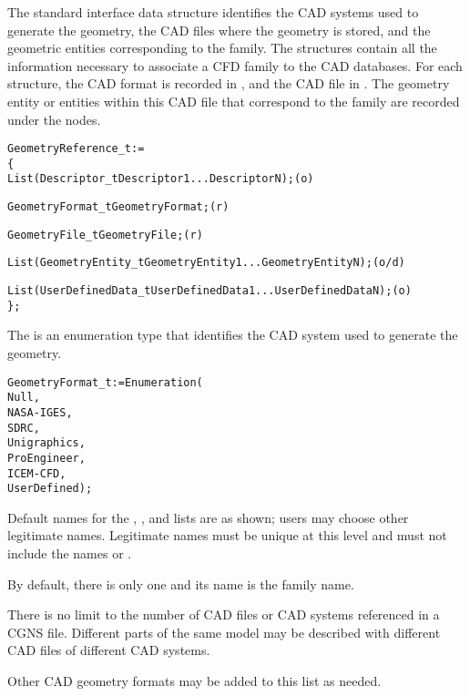 The standard interface data structure identifies the CAD systems used
to generate the geometry, the CAD files where the geometry is stored,
and the geometric entities corresponding to the family.
The  structures contain all the information
necessary to associate a CFD family to the CAD databases.
For each  structure, the CAD format
is recorded in , and the CAD file in
.
The geometry entity or entities within this CAD file that correspond to
the family are recorded under the  nodes.

\begin{alltt}
  GeometryReference\_t :=
    \{
    List( Descriptor\_t Descriptor1 ... DescriptorN ) ;                      (o)

    GeometryFormat\_t GeometryFormat ;                                       (r)

    GeometryFile\_t GeometryFile ;                                           (r)

    List (GeometryEntity\_t GeometryEntity1 ... GeometryEntityN) ;           (o/d)

    List( UserDefinedData\_t UserDefinedData1 ... UserDefinedDataN ) ;       (o)
    \} ;
\end{alltt}

The  is an enumeration type that identifies the CAD
system used to generate the geometry.

\begin{alltt}
  GeometryFormat_t := Enumeration(
    Null,
    NASA-IGES,
    SDRC,
    Unigraphics,
    ProEngineer,
    ICEM-CFD,
    UserDefined ) ;
\end{alltt}

\begin{notes}
\item
Default names for the , , and
lists are as shown; users may choose other legitimate names.
Legitimate names must be unique at this level and must not include the
names  or .
\item
By default, there is only one  and its name is
the family name.
\item
There is no limit to the number of CAD files or CAD systems referenced
in a CGNS file.
Different parts of the same model may be described with different CAD
files of different CAD systems.
\item
Other CAD geometry formats may be added to this list as needed.
\end{notes}

